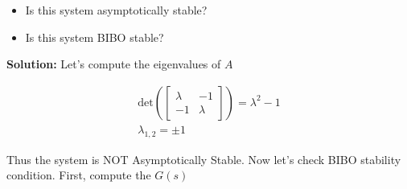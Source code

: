 \documentclass[twoside]{article}
\begin{document}
\begin{itemize}
	\item Is this system asymptotically stable? 
	\item Is this system BIBO stable?
\end{itemize}

\textbf{Solution:} Let's compute the eigenvalues of $A$

\begin{align*}
\mathrm{det} \left( \left[ \begin{array}{cc} \lambda & -1 \\ -1 &
                                                                  \lambda \end{array}
                                                                  \right]
                                                                  \right)
                                                                  =
                                                                  \lambda^2
                                                                  - 1
\\
\lambda_{1,2} = \pm 1
\end{align*}

Thus the system is NOT Asymptotically Stable.
Now let's check  BIBO stability condition. 
First, compute the $G(s)$
\end{document}
